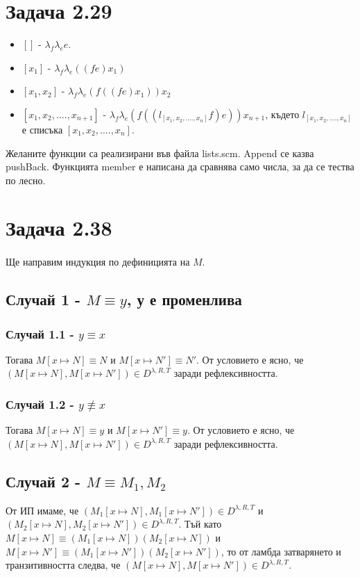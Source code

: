 \documentclass[12pt]{article}
\begin{document}
\section*{Задача 2.29}
\begin{itemize}
	\item $[]$ - $\lambda_f \lambda_e e$.
	\item $[x_1]$ - $\lambda_f \lambda_e ((fe)x_1)$	
	\item $[x_1, x_2]$ - $\lambda_f \lambda_e (f((fe)x_1))x_2$
	\item $[x_1, x_2, ...., x_{n+1}]$ - $\lambda_f \lambda_e (f((l_{[x_1, x_2, ...., x_{n}]} f) e)) x_{n+1}$, където $l_{[x_1, x_2, ...., x_{n}]}$ е списъка $[x_1, x_2, ...., x_{n}]$. 	
\end{itemize}

Желаните функции са реализирани във файла lists.scm. Append се казва pushBack. Функцията member е написана да сравнява само числа, за да се тества по лесно.

\section*{Задача 2.38}
\paragraph*{}
Ще направим индукция по дефиницията на $M$.

\subsection*{Случай 1 - $M \equiv y$, у е променлива}
\subsubsection*{Случай 1.1 - $y \equiv x$}
Тогава $M[x \longmapsto N] \equiv N$ и $M[x \longmapsto N'] \equiv N'$. От условието е ясно, че $(M[x \longmapsto N], M[x \longmapsto N']) \in D^{\lambda, R, T}$ заради рефлексивността.
\subsubsection*{Случай 1.2 - $y \not\equiv x$}
Тогава $M[x \longmapsto N] \equiv y$ и $M[x \longmapsto N'] \equiv y$. От условието е ясно, че $(M[x \longmapsto N], M[x \longmapsto N']) \in D^{\lambda, R, T}$ заради рефлексивността.

\subsection*{Случай 2 - $M \equiv M_1, M_2$}
От ИП имаме, че $(M_1[x \longmapsto N], M_1[x \longmapsto N']) \in D^{\lambda, R, T}$ и $(M_2[x \longmapsto N], M_2[x \longmapsto N']) \in D^{\lambda, R, T}$. Тъй като $M[x \longmapsto N] \equiv (M_1[x \longmapsto N])(M_2[x \longmapsto N])$ и $M[x \longmapsto N'] \equiv (M_1[x \longmapsto N'])(M_2[x \longmapsto N'])$, то от ламбда затварянето и транзитивността следва, че $(M[x \longmapsto N], M[x \longmapsto N']) \in D^{\lambda, R, T}$.
\end{document}
